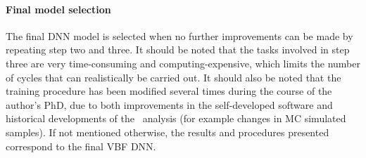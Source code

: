 \paragraph{Final model selection}
The final DNN model is selected when no further improvements can be made by repeating step two and three. It should be noted that the tasks involved in step three are very time-consuming and computing-expensive, which limits the number of cycles that can realistically be carried out.
It should also be noted that the training procedure has been modified several times during the course of the author's PhD, due to both improvements in the self-developed software and historical developments of the \HWW\ analysis (for example changes in MC simulated samples). If not mentioned otherwise, the results and procedures presented correspond to the final VBF DNN. 





